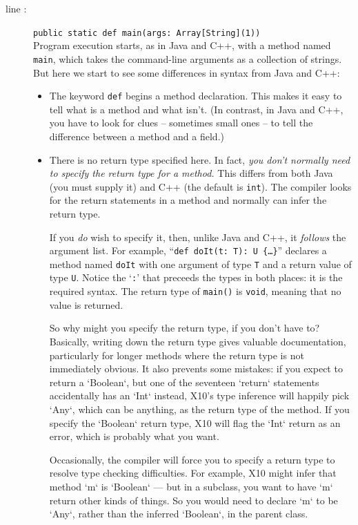 \begin{description}
\item [line :] {\tt public static def main(args:
Array[String](1))}\\ Program execution starts, as in Java and C++, with a
method named {\tt main}, which takes the command-line arguments as a collection
of strings. But here we start to see some differences in syntax from Java and
C++:
\begin{itemize}
\item The keyword {\tt def} begins a method declaration.   
This makes it easy to tell what is a method and what isn't. 
(In contrast, in Java and C++, you have to look for clues -- sometimes small
ones -- to tell
the difference between a method and a field.)

\item There is no return type specified here.
In fact, {\em you don't normally need to specify the return
type for a method.} This differs from both Java (you must supply it) and C++
(the default is {\tt int}).  The \Xten{} compiler looks for the return
statements in a method and normally can infer the return type. 

If you {\em do} wish to specify it, then, unlike Java and C++, it {\em follows} the
argument list.  For example, ``{\tt def doIt(t: T): U \{\ldots\}}'' declares a
method named {\tt doIt} with one argument of type {\tt T} and a return value of
type {\tt U}.  Notice the `{\tt :}' that preceeds the types in both places:
it is the required syntax.  The return type of {\tt main()} is {\tt void},
meaning that no value is returned.

So why might you specify the return type, if you don't have to?  Basically,
writing down the return type gives valuable documentation, particularly for
longer methods where the return type is not immediately obvious.   It also
prevents some mistakes: if you expect to return a \xcd`Boolean`, but one of
the seventeen \xcd`return` statements accidentally has an \xcd`Int` instead,
X10's type inference will happily pick \xcd`Any`, which can be anything, as
the return type of the method.  If you specify the \xcd`Boolean` return type,
X10 will flag the \xcd`Int` return as an error, which is probably what you want.

Occasionally, the compiler will force you to specify a return
type to resolve type checking difficulties.  For example, X10 might infer that
method \xcd`m` is \xcd`Boolean` --- but in a subclass, you want to have
\xcd`m` return other kinds of things.  So you would need to declare \xcd`m` to
be \xcd`Any`, rather than the inferred \xcd`Boolean`, in the parent class.  


\end{itemize}
\end{description}
